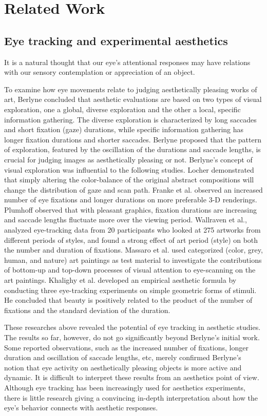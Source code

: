 \section{Related Work}
\label{sec:rel}
\subsection{Eye tracking and experimental aesthetics}
It is a natural thought that our eye's attentional responses may have relations with our sensory contemplation or appreciation of an object.

To examine how eye movements relate to judging aesthetically pleasing works of art, Berlyne\cite{Berlyne1971} concluded that aesthetic evaluations are based on two types of visual exploration, one a global, diverse exploration and the other a local, specific information gathering. The diverse exploration is characterized by long saccades and short fixation (gaze) durations, while specific information gathering has longer fixation durations and shorter saccades. Berlyne proposed that the pattern of exploration, featured by the oscillation of the durations and saccade lengths, is crucial for judging images as aesthetically pleasing or not. Berlyne's concept of visual exploration was influential to the following studies. Locher\cite{Locher2006} demonstrated that simply altering the color-balance of the original abstract compositions will change the distribution of gaze and scan path. Franke et al.\cite{Franke2008} observed an increased number of eye fixations and longer durations on more preferable 3-D renderings. Plumhoff\cite{Plumhoff2009} observed that with pleasant graphics,  fixation durations are increasing and saccade lengths fluctuate more over the viewing period. Wallraven et al.\cite{Wallraven2009}, analyzed eye-tracking data from 20 participants who looked at 275 artworks from different periods of styles, and found a strong effect of art period (style) on both the number and duration of fixations. Massaro et al.\cite{Massaro} used categorized (color, grey, human, and nature) art paintings as test material to investigate the contributions of bottom-up and top-down processes of visual attention to eye-scanning on the art paintings. Khalighy et al.\cite{Khalighy2015} developed an empirical aesthetic formula by conducting three eye-tracking experiments on simple geometric forms of stimuli. He concluded that beauty is positively related to the product of the number of fixations and the standard deviation of the duration.

These researches above revealed the potential of eye tracking in aesthetic studies. The results so far, however, do not go significantly beyond Berlyne's initial work. Some reported observations, such as the increased number of fixations, longer duration and oscillation of saccade lengths, etc, merely confirmed Berlyne's notion that eye activity on aesthetically pleasing objects is more active and dynamic. It is difficult to interpret these results from an aesthetics point of view. Although eye tracking has been increasingly used for aesthetics experiments, there is little research giving a convincing in-depth interpretation about how the eye's behavior connects with aesthetic responses.

